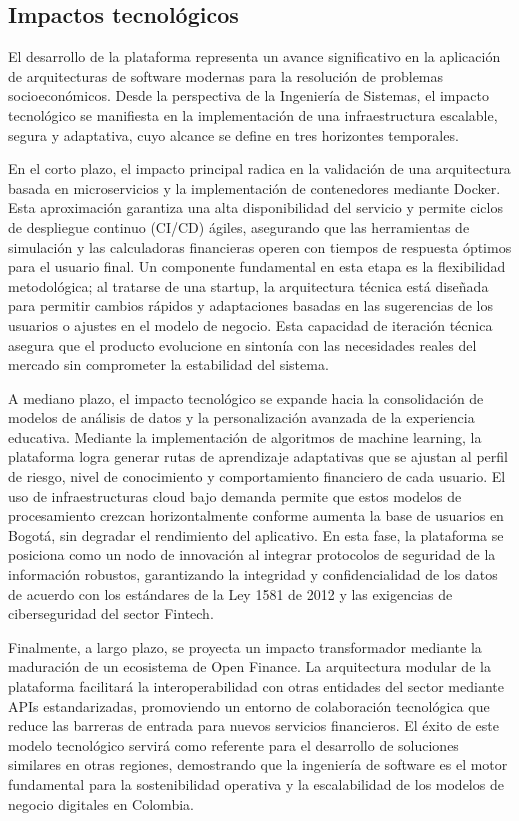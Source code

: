 \subsection*{Impactos tecnológicos}

El desarrollo de la plataforma representa un avance significativo en la aplicación de arquitecturas de software modernas para la resolución de problemas socioeconómicos. Desde la perspectiva de la Ingeniería de Sistemas, el impacto tecnológico se manifiesta en la implementación de una infraestructura escalable, segura y adaptativa, cuyo alcance se define en tres horizontes temporales.

En el corto plazo, el impacto principal radica en la validación de una arquitectura basada en microservicios y la implementación de contenedores mediante Docker. Esta aproximación garantiza una alta disponibilidad del servicio y permite ciclos de despliegue continuo (CI/CD) ágiles, asegurando que las herramientas de simulación y las calculadoras financieras operen con tiempos de respuesta óptimos para el usuario final. Un componente fundamental en esta etapa es la flexibilidad metodológica; al tratarse de una startup, la arquitectura técnica está diseñada para permitir cambios rápidos y adaptaciones basadas en las sugerencias de los usuarios o ajustes en el modelo de negocio. Esta capacidad de iteración técnica asegura que el producto evolucione en sintonía con las necesidades reales del mercado sin comprometer la estabilidad del sistema.

A mediano plazo, el impacto tecnológico se expande hacia la consolidación de modelos de análisis de datos y la personalización avanzada de la experiencia educativa. Mediante la implementación de algoritmos de machine learning, la plataforma logra generar rutas de aprendizaje adaptativas que se ajustan al perfil de riesgo, nivel de conocimiento y comportamiento financiero de cada usuario. El uso de infraestructuras cloud bajo demanda permite que estos modelos de procesamiento crezcan horizontalmente conforme aumenta la base de usuarios en Bogotá, sin degradar el rendimiento del aplicativo. En esta fase, la plataforma se posiciona como un nodo de innovación al integrar protocolos de seguridad de la información robustos, garantizando la integridad y confidencialidad de los datos de acuerdo con los estándares de la Ley 1581 de 2012 y las exigencias de ciberseguridad del sector Fintech.

Finalmente, a largo plazo, se proyecta un impacto transformador mediante la maduración de un ecosistema de Open Finance. La arquitectura modular de la plataforma facilitará la interoperabilidad con otras entidades del sector mediante APIs estandarizadas, promoviendo un entorno de colaboración tecnológica que reduce las barreras de entrada para nuevos servicios financieros. El éxito de este modelo tecnológico servirá como referente para el desarrollo de soluciones similares en otras regiones, demostrando que la ingeniería de software es el motor fundamental para la sostenibilidad operativa y la escalabilidad de los modelos de negocio digitales en Colombia.